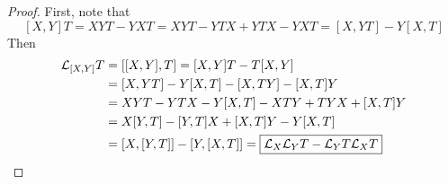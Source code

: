 \documentclass[a4paper, 10pt]{article}
\begin{document}
\begin{proof}
    First, note that
    \[ [X, Y]T = XYT - YXT = XYT - YTX + YTX - YXT = [X, YT] - Y[X, T] \]
    Then
    \begin{align*}
        \mathcal{L}_{[X,Y]}T &= [[X,Y],T] = [X,Y]T - T[X,Y] \\
        &= [X, YT] - Y[X,T] - [X, TY] - [X,T]Y \\
        &= XYT - YTX - Y[X,T] - XTY + TYX + [X,T]Y \\
        &= X[Y, T] - [Y, T]X + [X, T]Y - Y[X, T] \\
        &= [X, [Y, T]] - [Y, [X, T]] = \boxed{\mathcal{L}_{X}\mathcal{L}_{Y}T - \mathcal{L}_{Y}T\mathcal{L}_{X}T}
    \end{align*}
\end{proof}
\end{document}
